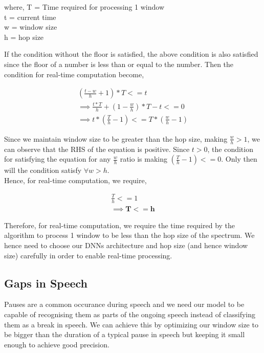 \documentclass[%
 reprint,
 amsmath,amssymb,
 aps,
]{revtex4-2}
\begin{document}
where,
\null\hfill T = Time required for processing 1 window \\
\null\hfill t = current time\\
\null\hfill w = window size\\
\null\hfill h = hop size

If the condition without the floor is satisfied, the above condition is also satisfied since the floor of a
number is less than or equal to the number. Then the condition for real-time computation become,

\begin{gather}
    (\frac{t-w}{h} + 1) * T <= t \\
    \implies \frac{t*T}{h} + ( 1 - \frac{w}{h} ) * T - t <= 0 \\
    \implies t *(\frac{T}{h} - 1) <= T * (\frac{w}{h} - 1)
\end{gather}

Since we maintain window size to be greater than the hop size, making $\frac{w}{h} > 1$,
we can observe that the RHS of the equation is positive. Since $t > 0$, the condition for satisfying
the equation for any $\frac{w}{h}$ ratio is making $( \frac{T}{h} - 1 ) <= 0$. Only then will the condition
satisfy $\forall w > h$.\\

Hence, for real-time computation, we require,

\begin{gather}
    \frac{T}{h} <= 1 \\
    \implies \mathbf{T <= h}
\end{gather}

Therefore, for real-time computation, we require the time required by the algorithm to process 1 window to be
less than the hop size of the spectrum. We hence need to choose our DNNs architecture and hop size
(and hence window size) carefully in order to enable real-time processing.

\vspace{-3mm}

\subsection{Gaps in Speech}
\vspace{-3mm}
Pauses are a common occurance during speech and we need our model to be capable of recognising them as parts
of the ongoing speech instead of classifying them as a break in speech. We can achieve this by optimizing
our window size to be bigger than the duration of a typical pause in speech but keeping it small enough to
achieve good precision.
\end{document}
